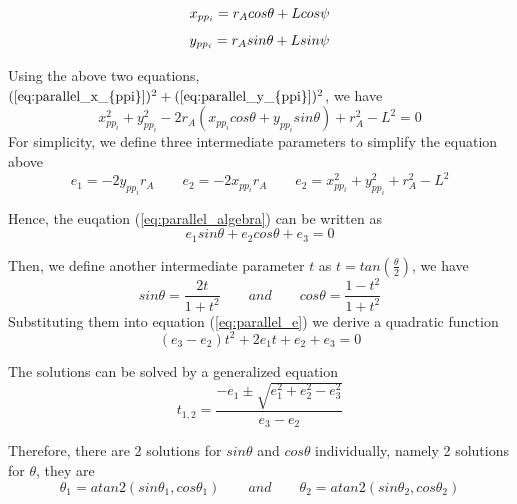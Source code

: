 \documentclass{article}
\begin{document}
\begin{equation}
\label{eq:parallel_x_{ppi}}
x_{pp_i} = r_Acos\theta+Lcos\psi
\end{equation}
\begin{equation}
\label{eq:parallel_y_{ppi}}
y_{pp_i} = r_Asin\theta+Lsin\psi
\end{equation}

Using the above two equations, $(\ref{eq:parallel_x_{ppi}})^2 + (\ref{eq:parallel_y_{ppi}})^2 $, we have
\begin{equation}
\label{eq:parallel_algebra}
x_{pp_i}^2 + y_{pp_i}^2 - 2r_A(x_{pp_i}cos\theta+y_{pp_i}sin\theta)+r_A^2-L^2 = 0
\end{equation}
For simplicity, we define three intermediate parameters to simplify the equation above
\begin{equation}
e_1 = -2y_{pp_i}r_A
\qquad
e_2 = -2x_{pp_i}r_A
\qquad
e_2 =x_{pp_i}^2+y_{pp_i}^2+r_A^2-L^2
\end{equation}

Hence, the euqation (\ref{eq:parallel_algebra}) can be written as
\begin{equation}
\label{eq:parallel_e}
e_1sin\theta + e_2cos\theta + e_3 = 0
\end{equation}

Then, we define another intermediate parameter $t$ as $t=tan(\frac{\theta}{2})$, we have
\begin{equation}
sin\theta=\frac{2t}{1+t^2}\qquad and \qquad cos\theta=\frac{1-t^2}{1+t^2}
\end{equation}
Substituting them into equation (\ref{eq:parallel_e}) we derive a quadratic function 
\begin{equation}
(e_3-e_2)t^2+2e_1t+e_2+e_3=0
\end{equation}

The solutions can be solved by a generalized equation
\begin{equation}
\label{eq:parallel_t}
t_{1,2}=\frac{-e_1\pm\sqrt{e_1^2+e_2^2-e_3^2}}{e_3-e_2}
\end{equation}

Therefore, there are 2 solutions for $sin\theta$ and $cos\theta$ individually, namely 2 solutions for $\theta$, they are
\begin{equation}
\theta_1 = atan2(sin\theta_1,cos\theta_1)\qquad and \qquad \theta_2 = atan2(sin\theta_2,cos\theta_2)
\end{equation}
\end{document}
